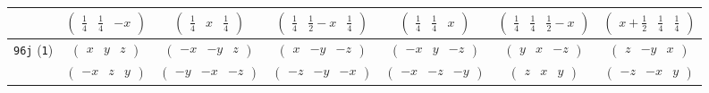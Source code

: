 \documentclass[fleqn,9pt,landscape]{jsarticle}
\begin{document}
\begin{center}
\begin{longtable}{ccccccc}
& $ \begin{pmatrix} \frac{1}{4} & \frac{1}{4} & - x \end{pmatrix} $ & $ \begin{pmatrix} \frac{1}{4} & x & \frac{1}{4} \end{pmatrix} $ & $ \begin{pmatrix} \frac{1}{4} & \frac{1}{2} - x & \frac{1}{4} \end{pmatrix} $ & $ \begin{pmatrix} \frac{1}{4} & \frac{1}{4} & x \end{pmatrix} $ & $ \begin{pmatrix} \frac{1}{4} & \frac{1}{4} & \frac{1}{2} - x \end{pmatrix} $ & $ \begin{pmatrix} x + \frac{1}{2} & \frac{1}{4} & \frac{1}{4} \end{pmatrix} $ \\ \hline
{\tt 96j} ({\tt 1}) & $ \begin{pmatrix} x & y & z \end{pmatrix} $ & $ \begin{pmatrix} - x & - y & z \end{pmatrix} $ & $ \begin{pmatrix} x & - y & - z \end{pmatrix} $ & $ \begin{pmatrix} - x & y & - z \end{pmatrix} $ & $ \begin{pmatrix} y & x & - z \end{pmatrix} $ & $ \begin{pmatrix} z & - y & x \end{pmatrix} $ \\
& $ \begin{pmatrix} - x & z & y \end{pmatrix} $ & $ \begin{pmatrix} - y & - x & - z \end{pmatrix} $ & $ \begin{pmatrix} - z & - y & - x \end{pmatrix} $ & $ \begin{pmatrix} - x & - z & - y \end{pmatrix} $ & $ \begin{pmatrix} z & x & y \end{pmatrix} $ & $ \begin{pmatrix} - z & - x & y \end{pmatrix} $ \\

\end{longtable}
\end{center}
\end{document}
